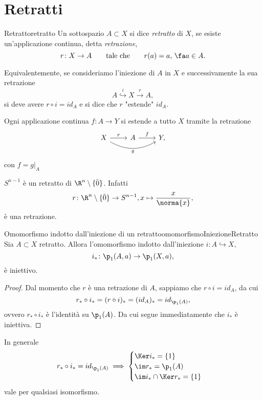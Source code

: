 \section{Retratti}

\begin{defn}{Retratto}{retratto}
	Un sottospazio \(A\subset X\) si dice \emph{retratto} di \(X\), se esiste un'applicazione continua, detta \emph{retrazione},
	\[
		r\colon X \to A \qquad\text{tale che}\qquad r(a)=a,\,\fa a\in A.
	\]
\end{defn}

\begin{oss}
	Equivalentemente, se consideriamo l'iniezione di \(A\) in \(X\) e successivamente la sua retrazione
	\[
		A \overset{i}{\hookrightarrow} X \xrightarrow{r} A,
	\]
	si deve avere \(r\circ i = id_A\) e si dice che \(r\) "estende" \(id_A\).
\end{oss}

\begin{oss}
	Ogni applicazione continua \(f\colon A \to Y\) si estende a tutto \(X\) tramite la retrazione
	\[
		\begin{tikzcd}
			X \arrow{r}{r} \arrow[bend right,swap]{rr}{g} & A \arrow{r}{f} & Y,
		\end{tikzcd}
	\]
	con \(f = g|_A\)
\end{oss}

\begin{ese}
	\(S^{n-1}\) è un retratto di \(\R^n\setminus\{\bar{0}\}\).
	Infatti
	\[
		r \colon \R^n\setminus\{\bar{0}\} \to S^{n-1}, x \mapsto \frac{x}{\norma{x}},
	\]
	è una retrazione.
\end{ese}

\begin{prop}{Omomorfismo indotto dall'iniezione di un retratto}{omomorfismoIniezioneRetratto}
	Sia \(A\subset X\) retratto.
	Allora l'omomorfismo indotto dall'iniezione \(i\colon A \hookrightarrow X\),
	\[
		i_* \colon \p_1(A,a) \to \p_1(X,a),
	\]
	è iniettivo.
\end{prop}

\begin{proof}
	Dal momento che \(r\) è una retrazione di \(A\), sappiamo che \(r \circ i = id_A\), da cui
	\[
		r_* \circ i_* = (r \circ i)_* = (id_A)_* = id_{\p_1(A)},
	\]
	ovvero \(r_* \circ i_*\) è l'identità su \(\p_1(A)\).
	Da cui segue immediatamente che \(i_*\) è iniettiva.
\end{proof}

\begin{oss}
	In generale
	\[
		r_* \circ i_* = id_{\p_1(A)} \implies 	\begin{cases}
			\Ker i_* = \{1\}  \\
			\im r_* = \p_1(A) \\
			\im i_* \cap \Ker r_* = \{1\}
		\end{cases}
	\]
	vale per qualsiasi isomorfismo.
\end{oss}

